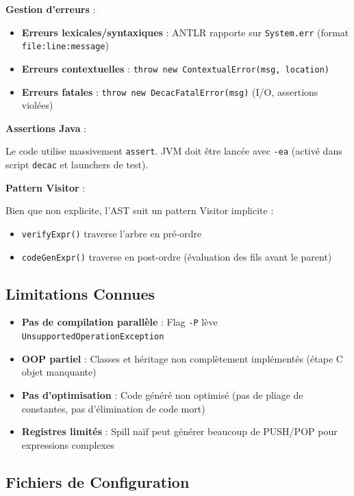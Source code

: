 \documentclass[12pt,a4paper]{article}
\begin{document}
\textbf{Gestion d'erreurs} :

\begin{itemize}[itemsep=0.2em]
    \item \textbf{Erreurs lexicales/syntaxiques} : ANTLR rapporte sur \texttt{System.err} (format \texttt{file:line:message})
    \item \textbf{Erreurs contextuelles} : \texttt{throw new ContextualError(msg, location)}
    \item \textbf{Erreurs fatales} : \texttt{throw new DecacFatalError(msg)} (I/O, assertions violées)
\end{itemize}

\textbf{Assertions Java} :

Le code utilise massivement \texttt{assert}. JVM doit être lancée avec \texttt{-ea} (activé dans script \texttt{decac} et launchers de test).

\textbf{Pattern Visitor} :

Bien que non explicite, l'AST suit un pattern Visitor implicite :

\begin{itemize}[itemsep=0.2em]
    \item \texttt{verifyExpr()} traverse l'arbre en pré-ordre
    \item \texttt{codeGenExpr()} traverse en post-ordre (évaluation des fils avant le parent)
\end{itemize}

\subsection{Limitations Connues}

\begin{itemize}[itemsep=0.2em]
    \item \textbf{Pas de compilation parallèle} : Flag \texttt{-P} lève \texttt{UnsupportedOperationException}
    \item \textbf{OOP partiel} : Classes et héritage non complètement implémentés (étape C objet manquante)
    \item \textbf{Pas d'optimisation} : Code généré non optimisé (pas de pliage de constantes, pas d'élimination de code mort)
    \item \textbf{Registres limités} : Spill naïf peut générer beaucoup de PUSH/POP pour expressions complexes
\end{itemize}

\subsection{Fichiers de Configuration}
\end{document}
